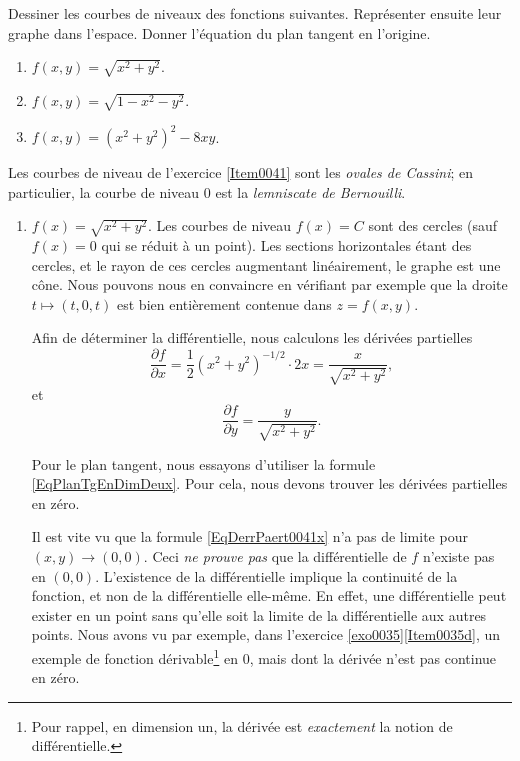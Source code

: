 \begin{example}
\begin{enumerate}
	\end{enumerate}

\end{example}



\begin{example}     \label{EXooELTHooDdJyJE}
	Dessiner les courbes de niveaux des fonctions suivantes. Représenter ensuite leur graphe dans l'espace. Donner l'équation du plan tangent en l'origine.
	\begin{enumerate}
		\item 			$f(x,y) = \sqrt{x^2+y^2}$.
		\item 			$f(x,y) = \sqrt{1-x^2-y^2}$.
		      \item\label{Item0041}	$f(x,y) = (x^2+y^2)^2-8xy$.
	\end{enumerate}
	Les courbes de niveau de l'exercice \ref{Item0041} sont  les \emph{ovales de Cassini}; en particulier, la courbe de niveau 0 est la \emph{lemniscate de Bernouilli}.

	\begin{enumerate}
		\item
		      $f(x)=\sqrt{x^2+y^2}$. Les courbes de niveau $f(x)=C$ sont des cercles (sauf $f(x)=0$ qui se réduit à un point). Les sections horizontales étant des cercles, et le rayon de ces cercles augmentant linéairement, le graphe est une cône. Nous pouvons nous en convaincre en vérifiant par exemple que la droite $t\mapsto(t,0,t)$ est bien entièrement contenue dans $z=f(x,y)$.

		      Afin de déterminer la différentielle, nous calculons les dérivées partielles
		      \begin{equation}		\label{EqDerrPaert0041x}
			      \frac{ \partial f }{ \partial x }=\frac{1}{ 2 }(x^2+y^2)^{-1/2}\cdot 2x=\frac{ x }{ \sqrt{x^2+y^2} },
		      \end{equation}
		      et
		      \begin{equation}		\label{EqDerrPart0041y}
			      \frac{ \partial f }{ \partial y }=\frac{ y }{ \sqrt{x^2+y^2} }.
		      \end{equation}

		      Pour le plan tangent, nous essayons d'utiliser la formule  \eqref{EqPlanTgEnDimDeux}. Pour cela, nous devons trouver les dérivées partielles en zéro.

		      Il est vite vu que la formule \eqref{EqDerrPaert0041x} n'a pas de limite pour $(x,y)\to(0,0)$. Ceci \emph{ne prouve pas} que la différentielle de $f$ n'existe pas en $(0,0)$. L'existence de la différentielle implique la continuité de la fonction, et non de la différentielle elle-même. En effet, une différentielle peut exister en un point sans qu'elle soit la limite de la différentielle aux autres points. Nous avons vu par exemple, dans l'exercice \ref{exo0035}\ref{Item0035d}, un exemple de fonction dérivable\footnote{Pour rappel, en dimension un, la dérivée est \emph{exactement} la notion de différentielle.} en $0$, mais dont la dérivée n'est pas continue en zéro.


\end{enumerate}
\end{example}
